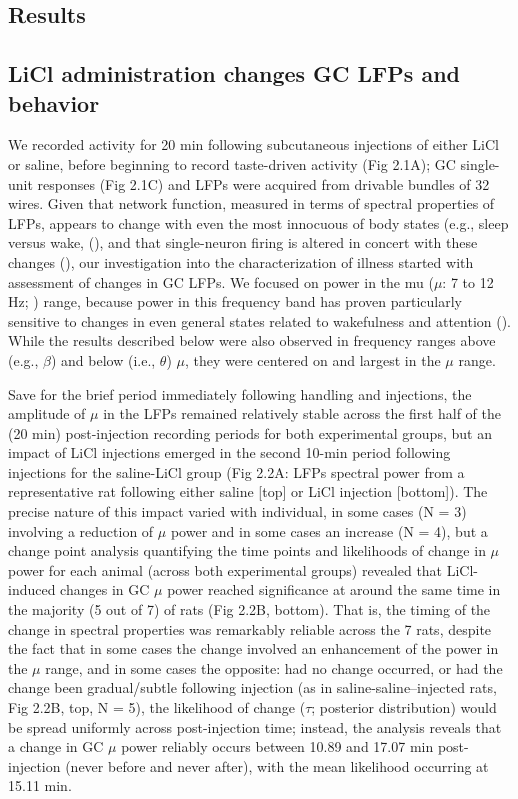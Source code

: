\begin{refsection}
\section{Results}
\subsection{LiCl administration changes GC LFPs and behavior}
We recorded activity for 20 min following subcutaneous injections of either LiCl or saline, before beginning to record taste-driven activity (Fig 2.1A); GC single-unit responses (Fig 2.1C) and LFPs were acquired from drivable bundles of 32 wires. Given that network function, measured in terms of spectral properties of LFPs, appears to change with even the most innocuous of body states (e.g., sleep versus wake, (\cite{mukamel2014a,ab2015a}), and that single-neuron firing is altered in concert with these changes (\cite{manning2009a,fontanini2008a}), our investigation into the characterization of illness started with assessment of changes in GC LFPs. We focused on power in the mu (\(\mu\): 7 to 12 Hz; \cite{fontanini2005a}) range, because power in this frequency band has proven particularly sensitive to changes in even general states related to wakefulness and attention (\cite{ching2014a,fontanini2005a,fontanini2006a,tort2010a,vijayan2013a}). While the results described below were also observed in frequency ranges above (e.g., \(\beta\)) and below (i.e., \(\theta\)) \(\mu\), they were centered on and largest in the \(\mu\) range.

Save for the brief period immediately following handling and injections, the amplitude of \(\mu\) in the LFPs remained relatively stable across the first half of the (20 min) post-injection recording periods for both experimental groups, but an impact of LiCl injections emerged in the second 10-min period following injections for the saline-LiCl group (Fig 2.2A: LFPs spectral power from a representative rat following either saline [top] or LiCl injection [bottom]). The precise nature of this impact varied with individual, in some cases (N = 3) involving a reduction of \(\mu\) power and in some cases an increase (N = 4), but a change point analysis quantifying the time points and likelihoods of change in \(\mu\) power for each animal (across both experimental groups) revealed that LiCl-induced changes in GC \(\mu\) power reached significance at around the same time in the majority (5 out of 7) of rats (Fig 2.2B, bottom). That is, the timing of the change in spectral properties was remarkably reliable across the 7 rats, despite the fact that in some cases the change involved an enhancement of the power in the \(\mu\) range, and in some cases the opposite: had no change occurred, or had the change been gradual/subtle following injection (as in saline-saline–injected rats, Fig 2.2B, top, N = 5), the likelihood of change (\(\tau\); posterior distribution) would be spread uniformly across post-injection time; instead, the analysis reveals that a change in GC \(\mu\) power reliably occurs between 10.89 and 17.07 min post-injection (never before and never after), with the mean likelihood occurring at 15.11 min.


\end{refsection}
